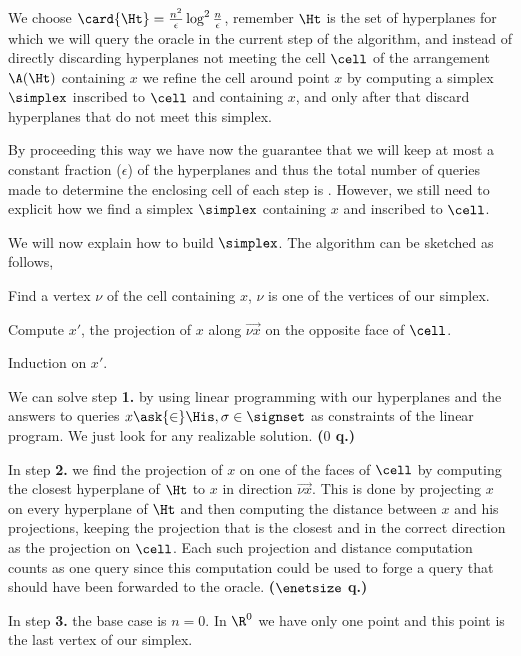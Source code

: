 We choose $\card{\Ht} = \frac{n^2}{\epsilon} \log^2 \frac{n}{\epsilon}$,
remember $\Ht$ is the set of hyperplanes for which we will query the oracle in
the current step of the algorithm, and instead of directly discarding
hyperplanes not meeting the cell $\cell$ of the arrangement $\A(\Ht)$ containing $x$ we
refine the cell around point $x$ by computing a simplex $\simplex$ inscribed
to $\cell$ and containing $x$, and only after that discard hyperplanes that do
not meet this simplex.

By proceeding this way we have now the guarantee that we will keep at most a
constant fraction ($\epsilon$) of the hyperplanes and thus the total number of
queries made to determine the enclosing cell of
each step is . However, we
still need to explicit how we find a simplex $\simplex$ containing $x$ and
inscribed to $\cell$.

We will now explain how to build $\simplex$. The algorithm can be sketched as
follows,

\begin{description}
\addtolength{\itemsep}{-0.5\baselineskip}
\item[1.$\;$] Find a vertex $\nu$ of the cell containing $x$, $\nu$ is one of
the vertices of our simplex.
\item[2.$\;$] Compute $x'$, the projection of $x$ along $\vec{\nu x}$ on the
opposite face of $\cell$.
\item[3.$\;$] Induction on $x'$.
\end{description}

We can solve step \textbf{1.} by using linear programming with our
\BigO{\enetsize} hyperplanes and the
answers to queries $x \ask{\in} \His, \sigma \in \signset$ as
constraints of the linear program. We just look for any realizable solution.
\textbf{($0$ q.)}

In step \textbf{2.} we find the projection of $x$ on one of the faces of
$\cell$ by computing the closest hyperplane of $\Ht$ to $x$ in direction
$\vec{\nu x}$. This is done by projecting $x$ on every hyperplane of $\Ht$ and
then computing the distance between $x$ and his projections, keeping the
projection that is the closest and in the correct direction as the projection
on $\cell$. Each such projection and distance computation counts as one query
since this computation could be used to forge a query that should have been
forwarded to the oracle.
\textbf{($\enetsize$ q.)}

In step \textbf{3.} the base case is $n = 0$. In $\R^0$ we have only one point
and this point is the last vertex of our simplex.

